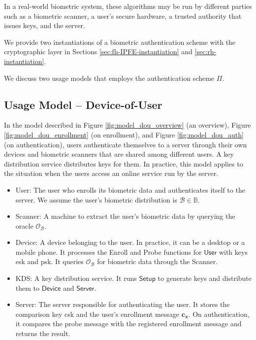 In a real-world biometric system, these algorithms may be run by different parties such as a biometric scanner, a user's secure hardware, a trusted authority that issues keys, and the server.

We provide two instantiations of a biometric authentication scheme with the cryptographic layer in Sections \ref{sec:fh-IPFE-instantiation} and \ref{sec:rh-instantiation}.



\iffalse

We discuss two usage models that employs the authentication scheme $\Pi$.


\subsection{Usage Model – Device-of-User}
\label{sec:dou_model}

In the model described in Figure \ref{fig:model_dou_overview} (an overview), Figure \ref{fig:model_dou_enrollment} (on enrollment), and Figure \ref{fig:model_dou_auth} (on authentication), users authenticate themselves to a server through their own devices and biometric scanners that are shared among different users.
A key distribution service distributes keys for them. In practice, this model applies to the situation when the users access an online service run by the server.

\begin{itemize}

	\item \textsf{User}: The user who enrolls its biometric data and authenticates itself to the server. We assume the user's biometric distribution is $\mathcal{B} \in \mathbb{B}$. 

	\item \textsf{Scanner}: A machine to extract the user's biometric data by querying the oracle $\mathcal{O}_{\mathcal{B}}$.
	
	\item \textsf{Device}: A device belonging to the user. In practice, it can be a desktop or a mobile phone. It processes the \textsf{Enroll} and \textsf{Probe} functions for $\textsf{User}$ with keys \textsf{esk} and \textsf{psk}. It queries $\mathcal{O}_{\mathcal{B}}$ for biometric data through the \textsf{Scanner}.
	
	\item \textsf{KDS}: A key distribution service. It runs $\textsf{Setup}$ to generate keys and distribute them to $\textsf{Device}$ and $\textsf{Server}$.
		
	\item \textsf{Server}: The server responsible for authenticating the user. It stores the comparison key \textsf{csk} and the user's enrollment message $\mathbf{c_x}$. On authentication, it compares the probe message with the registered enrollment message and returns the result.  

\end{itemize}

